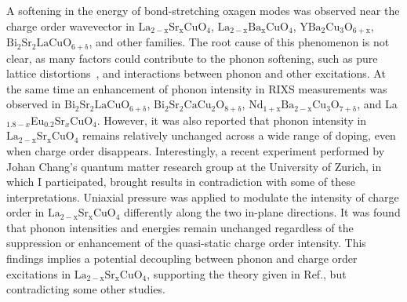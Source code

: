 \documentclass[11pt]{article}
\begin{document}
%
A softening in the energy of bond-stretching oxagen modes was observed near the charge order wavevector in $\mathrm{La_{2-x}Sr_{x}CuO_{4}}$\cite{lin_strongly_2020, wang_charge_2021, huang_quantum_2021}, $\mathrm{La_{2-x}Ba_{x}CuO_{4}}$\cite{miao_incommensurate_2018}, $\mathrm{YBa_{2}Cu_{3}O_{6+x}}$\cite{tacon_inelastic_2014}, $\mathrm{Bi_{2}Sr_{2}LaCuO_{6+\delta}}$\cite{li_multiorbital_2020}, and other families. 
The root cause of this phenomenon is not clear, as many factors could contribute to the phonon softening, such as pure lattice distortions~\cite{lin_strongly_2020}, and interactions between phonon and other excitations.  
At the same time an enhancement of phonon intensity in RIXS measurements was observed in $\mathrm{Bi_{2}Sr_{2}LaCuO_{6+\delta}}$\cite{li_multiorbital_2020}, $\mathrm{Bi_{2}Sr_{2}CaCu_{2}O_{8+\delta}}$\cite{chaix_dispersive_2017}, $\mathrm{Nd_{1+x}Ba_{2-x}Cu_{3}O_{7+\delta}}$\cite{braicovich_determining_2020}, and {La$_{1.8-x}$Eu$_{0.2}$Sr$_x$CuO$_{4}$}\cite{peng_enhanced_2020,wang_charge_2021,huang_quantum_2021}. 
However, it was also reported that phonon intensity in $\mathrm{La_{2-x}Sr_{x}CuO_{4}}$ remains relatively unchanged across a wide range of doping, even when charge order disappears\cite{lin_strongly_2020}.  
Interestingly, a recent experiment performed by Johan Chang's quantum matter research group at the University of Zurich, in which I participated, brought results in contradiction with some of these interpretations. 
Uniaxial pressure was applied to modulate the intensity of charge order in $\mathrm{La_{2-x}Sr_{x}CuO_{4}}$ differently along the two in-plane directions. 
It was found that phonon intensities and energies remain unchanged regardless of the suppression or enhancement of the quasi-static charge order intensity. 
This findings implies a potential decoupling between phonon and charge order excitations in $\mathrm{La_{2-x}Sr_{x}CuO_{4}}$, supporting the theory given in Ref.\cite{lin_strongly_2020}, but contradicting some other studies\cite{li_multiorbital_2020, chaix_dispersive_2017,huang_quantum_2021}. 
\end{document}
